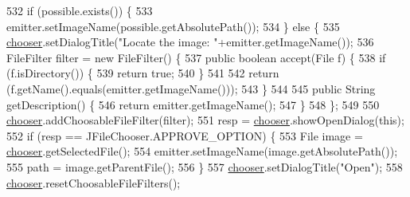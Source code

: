 \begin{DoxyCode}
532                         \textcolor{keywordflow}{if} (possible.exists()) \{
533                             emitter.setImageName(possible.getAbsolutePath());
534                         \} \textcolor{keywordflow}{else} \{
535                             \mbox{\hyperlink{classorg_1_1newdawn_1_1slick_1_1tools_1_1peditor_1_1_particle_editor_a7a921beab5e50d8482810cf42136ee17}{chooser}}.setDialogTitle(\textcolor{stringliteral}{"Locate the image: "}+emitter.getImageName());
536                             FileFilter filter = \textcolor{keyword}{new} FileFilter() \{
537                                 \textcolor{keyword}{public} \textcolor{keywordtype}{boolean} accept(File f) \{
538                                     \textcolor{keywordflow}{if} (f.isDirectory()) \{
539                                         \textcolor{keywordflow}{return} \textcolor{keyword}{true};
540                                     \}
541                                     
542                                     \textcolor{keywordflow}{return} (f.getName().equals(emitter.getImageName()));
543                                 \}
544     
545                                 \textcolor{keyword}{public} String getDescription() \{
546                                     \textcolor{keywordflow}{return} emitter.getImageName();
547                                 \}
548                             \};
549                             
550                             \mbox{\hyperlink{classorg_1_1newdawn_1_1slick_1_1tools_1_1peditor_1_1_particle_editor_a7a921beab5e50d8482810cf42136ee17}{chooser}}.addChoosableFileFilter(filter);
551                             resp = \mbox{\hyperlink{classorg_1_1newdawn_1_1slick_1_1tools_1_1peditor_1_1_particle_editor_a7a921beab5e50d8482810cf42136ee17}{chooser}}.showOpenDialog(\textcolor{keyword}{this});
552                             \textcolor{keywordflow}{if} (resp == JFileChooser.APPROVE\_OPTION) \{
553                                 File image = \mbox{\hyperlink{classorg_1_1newdawn_1_1slick_1_1tools_1_1peditor_1_1_particle_editor_a7a921beab5e50d8482810cf42136ee17}{chooser}}.getSelectedFile();
554                                 emitter.setImageName(image.getAbsolutePath());
555                                 path = image.getParentFile();
556                             \}
557                             \mbox{\hyperlink{classorg_1_1newdawn_1_1slick_1_1tools_1_1peditor_1_1_particle_editor_a7a921beab5e50d8482810cf42136ee17}{chooser}}.setDialogTitle(\textcolor{stringliteral}{"Open"});
558                             \mbox{\hyperlink{classorg_1_1newdawn_1_1slick_1_1tools_1_1peditor_1_1_particle_editor_a7a921beab5e50d8482810cf42136ee17}{chooser}}.resetChoosableFileFilters();

\end{DoxyCode}
